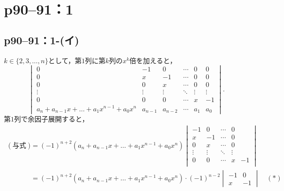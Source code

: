 \documentclass[a4paper,10pt,fleqn]{ltjsarticle}
\begin{document}
\section*{p90--91：1}


\subsection*{p90--91：1-(イ)}

\begin{tleftbar}
  $ k \in \{ 2,3 ,\ldots,n \}$として，第$1$列に第$k$列の$x^k$倍を加えると，
  \[
    \begin{vmatrix}
      0                                              & -1      & 0       & \cdots & 0      & 0      \\
      0                                              & x       & -1      & \cdots & 0      & 0      \\
      0                                              & 0       & x       & \cdots & 0      & 0      \\
      \vdots                                         & \vdots  & \vdots  & \ddots & \vdots & \vdots \\
      0                                              & 0       & 0       & \cdots & x      & -1     \\
      a_n + a_{n-1} x + \dots +a_1 x^{n-1} + a_0 x^n & a_{n-1} & a_{n-2} & \cdots & a_1    & a_0
    \end{vmatrix}.
  \]
  第$1$列で余因子展開すると，
  \begin{align*}
    (\text{与式}) & = (-1)^{n+2} (a_n + a_{n-1} x + \dots +a_1 x^{n-1} + a_0 x^n)
    \begin{vmatrix}
      -1     & 0      & \cdots & 0           \\
      x      & -1     & \cdots & 0           \\
      0      & x      & \cdots & 0           \\
      \vdots & \vdots & \ddots & \vdots &    \\
      0      & 0      & \cdots & x      & -1 \\
    \end{vmatrix}                                                                                                                           \\
                & = (-1)^{n+2}(a_n + a_{n-1} x + \dots +a_1 x^{n-1} + a_0 x^n) \cdot (-1)^{n-2} \begin{vmatrix} -1 & 0 \\ x & -1 \end{vmatrix} \quad (\text{$\ast$}) \\

\end{align*}
\end{tleftbar}
\end{document}
